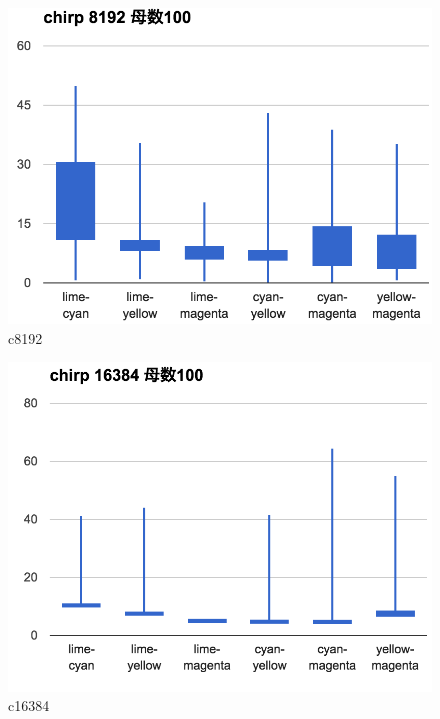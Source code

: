 \begin{figure}[p]
  \centering
  \includegraphics[clip,width=1.05\hsize]{img/c8192.png}
  \caption{c8192}\label{fig:c8192}
\end{figure}

\begin{figure}[p]
  \centering
  \includegraphics[clip,width=1.05\hsize]{img/c16384.png}
  \caption{c16384}\label{fig:c16384}
\end{figure}

